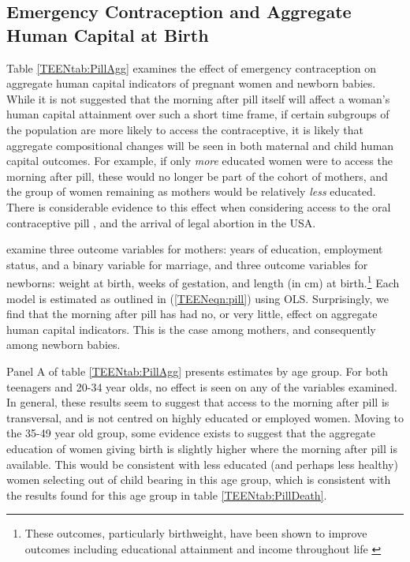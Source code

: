 \subsection{Emergency Contraception and Aggregate Human Capital at Birth}
Table \ref{TEENtab:PillAgg} examines the effect of emergency contraception on
aggregate human capital indicators of pregnant women and newborn babies.  While
it is not suggested that the morning after pill itself will affect a woman's
human capital attainment over such a short time frame, if certain subgroups of 
the population are more likely to access the contraceptive, it is likely that 
aggregate compositional changes will be seen in both maternal and child human 
capital outcomes.  For example, if only \emph{more} educated women were to 
access the morning after pill, these would no longer be part of the cohort of
mothers, and the group of women remaining as mothers would be relatively 
\emph{less} educated. There is considerable evidence to this effect when 
considering access to the oral contraceptive pill \citep{Baileyetal2012,
OltmansHungerman2012,ChiapporiOreffice2008}, and the arrival of legal abortion 
\citep{Whitaker2011,Ananatetal2009} in the USA.

\Person examine three outcome variables for mothers: years of education, 
employment status, and a binary variable for marriage, and three outcome variables
for newborns: weight at birth, weeks of gestation, and length (in cm) at 
birth.\footnote{These outcomes, particularly birthweight, have been shown to
improve outcomes including educational attainment and income throughout life 
\citep{BehrmanRosenzweig2004}}  Each model is estimated as outlined in 
(\ref{TEENeqn:pill}) using OLS.  Surprisingly, we find that the morning after
pill has had no, or very little, effect on aggregate human capital indicators.
This is the case among mothers, and consequently among newborn babies.

Panel A of table \ref{TEENtab:PillAgg} presents estimates by age group.  For
both teenagers and 20-34 year olds, no effect is seen on any of the variables
examined. In general, these results seem to suggest that access to the morning 
after pill is transversal, and is not centred on highly educated or employed 
women.  Moving to the 35-49 year old group, some evidence exists to suggest
that the aggregate education of women giving birth is slightly higher where
the morning after pill is available.  This would be consistent with less
educated (and perhaps less healthy) women selecting out of child bearing in
this age group, which is consistent with the results found for this age group
in table \ref{TEENtab:PillDeath}.

